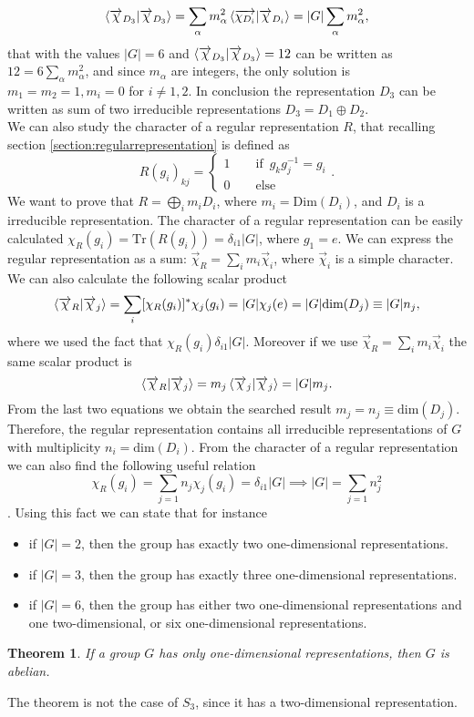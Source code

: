 \documentclass[12pt]{book}
\theoremstyle{plain}
\newtheorem{thm}{Theorem}[section]
\theoremstyle{definition}
\theoremstyle{remark}
\begin{document}
\[\braket{\overrightarrow{\chi}_{D_3}|\overrightarrow{\chi}_{D_3}} = \sum_\alpha m_\alpha^2 \braket{\overrightarrow{\chi_{D_i}}|\overrightarrow{\chi}_{D_i}} = |G|\sum_{\alpha}m_\alpha^2, \]
that with the values $|G| = 6$ and $\braket{\overrightarrow{\chi}_{D_3}|\overrightarrow{\chi}_{D_3}}=12$ can be written as $12 = 6\sum_{\alpha}m_\alpha^2$, and since $m_\alpha$ are integers, the only solution is $m_1 = m_2 = 1, m_i = 0$ for $i\neq 1,2$. In conclusion the representation $D_3$ can be written as sum of two irreducible representations $D_3 = D_1 \oplus D_2$.\\
We can also study the character of a regular representation $R$, that recalling section \ref{section:regularrepresentation} is defined as
\[R(g_i)_{kj} = \begin{cases}
1\qquad \text{if}\,\,\, g_kg_j^{-1} = g_i\\
0 \qquad \text{else}
\end{cases}.\]
We want to prove that $R = \bigoplus_{i}m_i D_i$, where $m_i = \text{Dim}(D_i)$, and $D_i$ is a irreducible representation. The character of a regular representation can be easily calculated $\chi_R(g_i) = \text{Tr}(R(g_i)) = \delta_{i1}|G|$, where $g_1 = e$. We can express the regular representation as a sum: $\overrightarrow{\chi}_R = \sum_i m_i \overrightarrow{\chi}_i$, where $ \overrightarrow{\chi}_i$ is a simple character. We can also calculate the following scalar product 
\[\braket{\overrightarrow{\chi}_R| \overrightarrow{\chi}_j} = \sum_i [\chi_R(g_i)]^* \chi_j(g_i) = |G| \chi_j(e) = |G|\text{dim}(D_j) \equiv |G| n_j,\]
where we used the fact that $\chi_R(g_i) \delta_{i1}|G|$. Moreover if we use $\overrightarrow{\chi}_R = \sum_i m_i \overrightarrow{\chi}_i$ the same scalar product is
\[\braket{\overrightarrow{\chi}_R| \overrightarrow{\chi}_j} = m_j \braket{\overrightarrow{\chi}_j|\overrightarrow{\chi}_j} =|G| m_j.\]
From the last two equations we obtain the searched result $m_j = n_j \equiv \text{dim}(D_j)$. Therefore, the regular representation contains all irreducible representations of $G$ with multiplicity $n_i = \text{dim}(D_i)$. From the character of a regular representation we can also find the following useful relation
\[\chi_R(g_i) = \sum_{j=1} n_j \chi_j(g_i) = \delta_{i1}|G| \implies |G| = \sum_{j=1} n_j^2\].
Using this fact we can state that for instance
\begin{itemize}
\item if $|G|=2$, then the group has exactly two one-dimensional representations.
\item if $|G| = 3$, then the group has exactly three one-dimensional representations.  
\item if $|G| = 6$, then the group has either two one-dimensional representations and one two-dimensional, or six one-dimensional representations. 
\end{itemize}
\begin{thm}
If a group $G$ has only one-dimensional representations, then $G$ is abelian.
\end{thm}
The theorem is not the case of $S_3$, since it has a two-dimensional representation.
\end{document}

